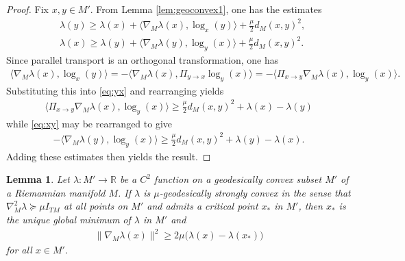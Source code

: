 \documentclass{article}
\newcommand{\RB}{\mathbb{R}}
\theoremstyle{plain}
\newtheorem{lemma}[theorem]{Lemma}
\theoremstyle{definition}
\theoremstyle{remark}
\begin{document}
\begin{proof}
    Fix $x,y\in M'$. From Lemma \ref{lem:geoconvex1}, one has the estimates
    \begin{align}
        &\lambda(y)\geq\lambda(x) + \langle\nabla_M\lambda(x),\log_x(y)\rangle + \frac{\mu}{2}d_M(x,y)^2,\label{eq:yx}\\&\lambda(x)\geq\lambda(y) + \langle\nabla_M\lambda(y),\log_y(x)\rangle + \frac{\mu}{2}d_M(x,y)^2\label{eq:xy}.
    \end{align}
    Since parallel transport is an orthogonal transformation, one has
    \begin{align}
        \langle \nabla_M\lambda(x),\log_x(y)\rangle = -\langle\nabla_M\lambda(x),\Pi_{y\rightarrow x}\log_y(x)\rangle = -\langle\Pi_{x\rightarrow y}\nabla_M\lambda(x),\log_y(x)\rangle.
    \end{align}
    Substituting this into \eqref{eq:yx} and rearranging yields
    \begin{align}
        \langle \Pi_{x\rightarrow y}\nabla_M\lambda(x),\log_y(x)\rangle \geq \frac{\mu}{2}d_M(x,y)^2 + \lambda(x)-\lambda(y)
    \end{align}
    while \eqref{eq:xy} may be rearranged to give
    \begin{align}
        -\langle \nabla_M\lambda(y),\log_y(x)\rangle\geq \frac{\mu}{2}d_M(x,y)^2 + \lambda(y)-\lambda(x).
    \end{align}
    Adding these estimates then yields the result.
\end{proof}

\begin{lemma}\label{lem:geoconvex3}
    Let $\lambda:M'\rightarrow \RB$ be a $C^2$ function on a geodesically convex subset $M'$ of a Riemannian manifold $M$. If $\lambda$ is $\mu$-geodesically strongly convex in the sense that $\nabla^2_M\lambda\succeq\mu I_{TM}$ at all points on $M'$ and admits a critical point $x_*$ in $M'$, then $x_*$ is the unique global minimum of $\lambda$ in $M'$ and
    \begin{align}
        \|\nabla_M\lambda(x)\|^2\geq 2\mu\big(\lambda(x)-\lambda(x_*)\big)
    \end{align}
    for all $x\in M'$.
\end{lemma}
\end{document}
